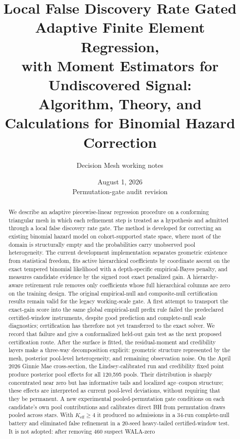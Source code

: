 \documentclass[11pt]{article}
\title{Local False Discovery Rate Gated Adaptive Finite Element Regression,\\
with Moment Estimators for Undiscovered Signal:\\
\large Algorithm, Theory, and Calculations for Binomial Hazard Correction}
\author{Decision Mesh working notes}
\date{August 1, 2026\\Permutation-gate audit revision}
\begin{document}
\maketitle

\begin{abstract}
We describe an adaptive piecewise-linear regression procedure on a conforming triangular
mesh in which each refinement step is treated as a hypothesis and admitted through a
local false discovery rate gate. The method is developed for correcting an existing
binomial hazard model on cohort-supported state space, where most of the domain is
structurally empty and the probabilities carry unobserved pool heterogeneity. The current
development implementation separates geometric existence from statistical freedom, fits
active hierarchical coefficients by coordinate ascent on the exact tempered binomial
likelihood with a depth-specific empirical-Bayes penalty, and measures candidate evidence
by the signed root exact penalized gain. A hierarchy-aware retirement rule removes only
coefficients whose full hierarchical columns are zero on the training design. The
original empirical-null and composite-null certification results remain valid for the
legacy working-scale gate. A first attempt to transport the exact-gain score into the
same global empirical-null prefix rule failed the predeclared certified-window
instruments, despite good prediction and complete-null scale diagnostics; certification
has therefore not yet transferred to the exact solver. We record that failure and give a
conformalized held-out gain test as the next proposed certification route. After the surface is fitted, the residual-moment and credibility layers make a
three-way decomposition explicit: geometric structure represented by the mesh, posterior
pool-level heterogeneity, and remaining observation noise. On the April 2026 Ginnie Mae
cross-section, the Lindsey-calibrated run and credibility fixed point produce posterior
pool effects for all 120{,}595 pools. Their distribution is sharply concentrated near zero
but has informative tails and localized age--coupon structure; these effects are interpreted
as current pool-level deviations, without requiring that they be permanent. A new experimental
pooled-permutation gate conditions on each candidate's own pool contributions and calibrates
direct BH from permutation draws pooled across stars. With $K_{\mathrm{eff}}\geq4$ it produced
no admissions in a 34-run complete-null battery and eliminated false refinement in a 20-seed
heavy-tailed certified-window test. It is not adopted: after removing 460 suspect WALA-zero

\end{abstract}
\end{document}
